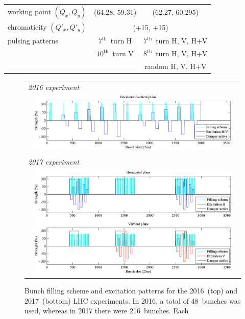\documentclass[%
 reprint,
 amsmath,amssymb,
 aps,
prstab,
longbibliography
]{revtex4-1}
\begin{document}
\begin{table}
\begin{ruledtabular}
\begin{tabular}{lcc}
      working point $(Q_x, Q_y)$ & (64.28, 59.31) & (62.27, 60.295) \\
      chromaticity $(Q'_x, Q'_y)$ & \multicolumn{2}{c}{(+15, +15)}\\ \hline
      pulsing patterns  & $7^{\mathrm{th}}$~turn H
                                  &$7^{\mathrm{th}}$~turn H, V, H+V \\
                & $10^{\mathrm{th}}$~turn V & $8^{\mathrm{th}}$~turn
                                              H, V, H+V \\
                & &  random  H, V, H+V\\
    \end{tabular}
  \end{ruledtabular}
\end{table}

\begin{figure}
  \begin{tabular}{c}
    \multicolumn{1}{l}{\emph{2016 experiment}} \\
    \includegraphics[width=0.95\textwidth]{bunchfilling_2016.png} \\
    \\
    \multicolumn{1}{l}{\emph{2017 experiment}} \\
    \includegraphics[width=0.95\textwidth]{bunchfilling_2017.png}
  \end{tabular}
  \caption{Bunch filling scheme and excitation patterns for the
    2016~(top) and 2017~(bottom) LHC experiments. In 2016, a total of
    48~bunches was used, whereas in 2017 there were 216~bunches. Each
}
\end{figure}
\end{document}
